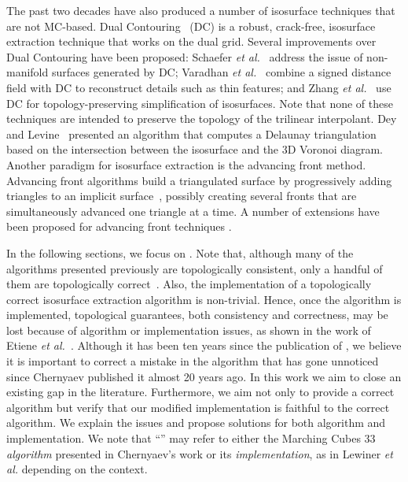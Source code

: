 The past two decades have also produced a number of isosurface techniques that are not MC-based. Dual Contouring~\cite{Ju:2002:DCH:566654.566586} (DC) is a robust, crack-free, isosurface extraction technique that works on the dual grid. Several improvements over Dual Contouring have been proposed: Schaefer \emph{et al.}~\cite{Schaefer:2007:MDC:1263130.1263312} address the issue of non-manifold surfaces generated by DC; Varadhan \emph{et al.}~\cite{Varadhan:2003:FSI:1081432.1081458} combine a signed distance field with DC to reconstruct details such as thin features; and Zhang \emph{et al.}~\cite{Zhang:2004:DCT:1032664.1034486} use DC for topology-preserving simplification of isosurfaces. Note that none of these techniques are intended to preserve the topology of the trilinear interpolant. Dey and Levine~\cite{Dey07} presented an algorithm that computes a Delaunay triangulation based on the intersection between the isosurface and the 3D Voronoi diagram. Another paradigm for isosurface extraction is the advancing front method. Advancing front algorithms build a triangulated surface by progressively adding triangles to an implicit surface~\cite{Hartmann98}, possibly creating several fronts that are simultaneously advanced one triangle at a time.  A number of extensions have been proposed for advancing front techniques \cite{Schreiner06, CGF:CGF972, Silva:1998:GCA:288692.288717}. 

In the following sections, we focus on \mc{}. Note that, although many of the  algorithms presented previously are topologically consistent, only a handful of them are topologically correct~\cite{Chernyaev95marchingcubes, Dey07}. Also, the implementation of a topologically correct isosurface extraction algorithm is non-trivial.
Hence, once the algorithm is implemented, topological guarantees, both  consistency and correctness, may be lost because of algorithm or implementation issues, as shown in the work of Etiene \emph{et al.}~\cite{Etiene:2012:TVI:2197070.2197097}. 
%
Although it has been ten years since the publication of \mc{}, we believe it is important to correct a mistake in the algorithm that has gone unnoticed since Chernyaev published it almost 20 years ago. In this work we aim to close an existing gap in the \mc{} literature. Furthermore, we aim not only to provide a correct algorithm but verify that our modified implementation is faithful to the correct algorithm.  We explain the issues and propose solutions for both algorithm and implementation. 
%
We note that ``\mc{}'' may refer to either the Marching Cubes 33 \emph{algorithm} presented in Chernyaev's work \cite{Chernyaev95marchingcubes} or its \emph{implementation}, as in Lewiner \emph{et al.}  \cite{Lewiner:2003} depending on the context.


